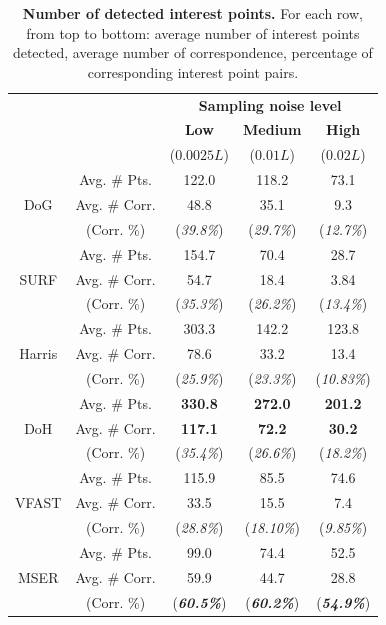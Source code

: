 \begin{table}[ht]
	\centering
	\begin{tabular}{|cc|ccc|}
\hline
& & \multicolumn{3}{c|}{\textbf{Sampling noise level}} \\
& &  {\textbf{Low}}  & {\textbf{Medium}}  & {\textbf{High}}  \\
& & ($0.0025L$) & ($0.01L$) & ($0.02L$) \\
\hline
\hline
\multirow{3}{*}{DoG}  & Avg. \# Pts. &   122.0 & 118.2 & 73.1 \\
& Avg. \# Corr. &  48.8 & 35.1 &  9.3 \\
& (Corr. \%) & (\textit{39.8\%}) & (\textit{29.7\%}) & (\textit{12.7\%}) \\
\hline
\multirow{3}{*}{SURF} & Avg. \# Pts. & 154.7 & 70.4  & 28.7 \\
& Avg. \# Corr. &  54.7 & 18.4  & 3.84 \\
& (Corr. \%) &  (\textit{35.3\%}) & (\textit{26.2\%})  & (\textit{13.4\%}) \\
\hline
\multirow{3}{*}{Harris} & Avg. \# Pts. & 303.3 & 142.2 &  123.8 \\
& Avg. \# Corr. & 78.6  & 33.2  &    13.4  \\
& (Corr. \%) & (\textit{25.9\%}) & (\textit{23.3\%}) & (\textit{10.83\%}) \\
\hline
\multirow{3}{*}{DoH}& Avg. \# Pts. &  {\textbf{\color{blue}330.8}} & {\textbf{\color{blue}272.0}} &   {\textbf{\color{blue}201.2}} \\
& Avg. \# Corr. & {\textbf{\color{blue}117.1}} & {\textbf{\color{blue}72.2}}  &   {\textbf{\color{blue}30.2}} \\
& (Corr. \%) & (\textit{35.4\%}) & (\textit{26.6\%}) & (\textit{18.2\%}) \\
\hline
\multirow{3}{*}{VFAST}& Avg. \# Pts. &  115.9 &  85.5  &  74.6\\ 
& Avg. \# Corr. & 33.5  & 15.5  &    7.4 \\
& (Corr. \%) & (\textit{28.8\%}) & (\textit{18.10\%})  & (\textit{9.85\%}) \\
\hline
\multirow{3}{*}{MSER}& Avg. \# Pts.  &  99.0  & 74.4  &   52.5 \\
& Avg. \# Corr. & 59.9 & 44.7  &   28.8 \\
& (Corr. \%) & ({\textit{\textbf{\color{blue}60.5\%}}})  & ({\textit{\textbf{\color{blue}60.2\%}}})  & ({\textit{\textbf{\color{blue}54.9\%}}})\\
\hline
\end{tabular}
\caption{\textbf{Number of detected interest points.} For each row, from top to bottom: average number of interest points detected, average number of correspondence, percentage of corresponding interest point pairs.}
\label{tab/eval/numcorr}
\end{table}



